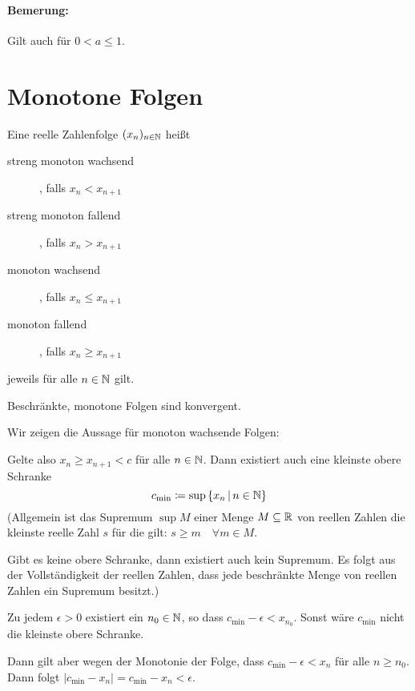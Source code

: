 \paragraph{Bemerung:} Gilt auch für $0<a\leq 1$.

\section{Monotone Folgen}
\begin{definition}{}
	Eine reelle Zahlenfolge $(x_n)_{n\in\mathbb{N}}$ heißt
	\begin{description}
		\item[streng monoton wachsend], falls $x_n<x_{n+1}$
		\item[streng monoton fallend], falls $x_n>x_{n+1}$
		\item[monoton wachsend], falls $x_n\leq x_{n+1}$
		\item[monoton fallend], falls $x_n\geq x_{n+1}$
	\end{description}
	jeweils für alle $n\in\mathbb{N}$ gilt.
\end{definition}

\begin{satz}{}
	Beschränkte, monotone Folgen sind konvergent.
\end{satz}
\beweis
Wir zeigen die Aussage für monoton wachsende Folgen:

Gelte also $x_n\geq x_{n+1}<c$ für alle $n\in\mathbb{N}$. Dann existiert auch eine kleinste obere Schranke
\begin{equation*}
	c_{\text{min}}\coloneqq \sup\left\{ x_n \,\middle|\, n\in\mathbb{N} \right\}
\end{equation*}
(Allgemein ist das Supremum $\sup M$ einer Menge $M\subseteq\mathbb{R}$ von reellen Zahlen die kleinste reelle Zahl $s$ für die gilt: $s\geq m\quad\forall m\in M$.

Gibt es keine obere Schranke, dann existiert auch kein Supremum. Es folgt aus der Vollständigkeit der reellen Zahlen, dass jede beschränkte Menge von reellen Zahlen ein Supremum besitzt.)

\par\medskip

Zu jedem $\epsilon>0$ existiert ein $n_0\in\mathbb{N}$, so dass $c_{\text{min}}-\epsilon<x_{n_0}$. Sonst wäre $c_{\text{min}}$ nicht die kleinste obere Schranke.

Dann gilt aber wegen der Monotonie der Folge, dass $c_{\text{min}}-\epsilon<x_n$ für alle $n\geq n_0$. Dann folgt $|c_{\text{min}}-x_n|=c_{\text{min}}-x_n<\epsilon$.
